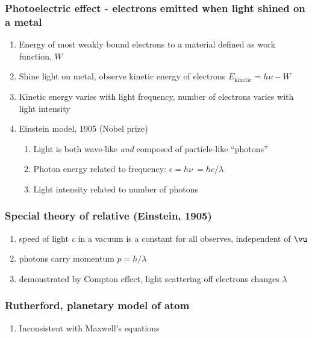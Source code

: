 \documentclass[11pt]{article}
\begin{document}
\subsubsection{Photoelectric effect - electrons emitted when light shined on a metal}
\label{sec:org74aee1c}
\begin{enumerate}
\item Energy of most weakly bound electrons to a material defined as work function, \(W\)
\item Shine light on metal, observe kinetic energy of electrons \(E_\text{kinetic}=h\nu -W\)
\item Kinetic energy varies with light frequency, number of electrons varies with light intensity
\item Einstein model, 1905 (Nobel prize)
\begin{enumerate}
\item Light is both wave-like \emph{and} composed of particle-like ``photons''
\item Photon energy related to frequency: \(\epsilon = h \nu\ = hc/\lambda\)
\item Light intensity related to number of photons
\end{enumerate}
\end{enumerate}
\subsubsection{Special theory of relative (Einstein, 1905)}
\label{sec:org5f5fac6}
\begin{enumerate}
\item speed of light \emph{c} in a vacuum is a constant for all observes, independent of \(\vu\)
\item photons carry momentum  \(p=h/\lambda\)
\item demonstrated by Compton effect, light scattering off electrons changes \(\lambda\)
\end{enumerate}
\subsubsection{Rutherford, planetary model of atom}
\label{sec:orgc5c1b8a}
\begin{enumerate}
\item Inconsistent with Maxwell's equations
\end{enumerate}
\end{document}
